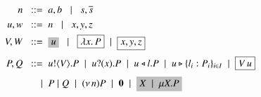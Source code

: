 	\begin{figure}[t]
		\begin{align*}
			n   \bnfis &  a,b \bnfbar s, \dual{s} 
			\\
			u,w   \bnfis & n \bnfbar x,y,z 
			\\
			V,W   \bnfis &\nonhosyntax{u} \bnfbar \nonpisyntax{\abs{x}{P}} \sbnfbar \nonpisyntax{x,y,z}
			\\[1mm]
			P,Q
			  \bnfis &
			\bout{u}{V}{P}  \sbnfbar  \binp{u}{x}{P} \sbnfbar
			\bsel{u}{l} P \sbnfbar \bbra{u}{l_i:P_i}_{i \in I} \sbnfbar \nonpisyntax{\appl{V}{u}} 
			\\[1mm]
			  \sbnfbar & P\Par Q \sbnfbar \news{n} P 
			\sbnfbar \inact \sbnfbar \nonhosyntax{\rvar{X} \sbnfbar \recp{X}{P}}
		\end{align*}
	\caption{}
	\label{fig:syntax}
\end{figure}

